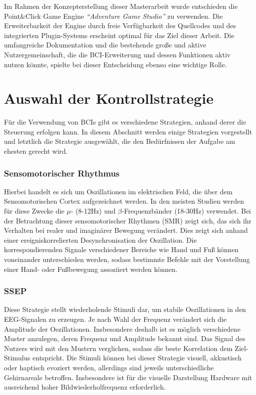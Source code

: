 Im Rahmen der Konzepterstellung dieser Masterarbeit wurde entschieden die Point\&Click Game Engine \textit{"`Adventure Game Studio"'} zu verwenden.
Die Erweiterbarkeit der Engine durch freie Verfügbarkeit des Quellcodes und des integrierten Plugin-Systems erscheint optimal für das Ziel dieser Arbeit.
Die umfangreiche Dokumentation und die bestehende große und aktive Nutzergemeinschaft, 
die die BCI-Erweiterung und dessen Funktionen aktiv nutzen könnte, 
spielte bei dieser Entscheidung ebenso eine wichtige Rolle.\\



\pagebreak
\section{Auswahl der Kontrollstrategie}
Für die Verwendung von BCIs gibt es verschiedene Strategien, anhand derer die Steuerung erfolgen kann.
In diesem Abschnitt werden einige Strategien vorgestellt und letztlich die Strategie ausgewählt, die den Bedürfnissen der Aufgabe am ehesten gerecht wird.\\



\subsubsection{Sensomotorischer Rhythmus}
Hierbei handelt es sich um Oszillationen im elektrischen Feld, die über dem Sensomotorischen Cortex aufgezeichnet werden.
In den meisten Studien werden für diese Zwecke die $\mu$- (8-12Hz) und $\beta$-Frequenzbänder (18-30Hz) verwendet.
Bei der Betrachtung dieser sensomotorischer Rhythmen \cite[S.227ff]{wolpaw2012braincomputer} (\acs{SMR}) zeigt sich, das sich ihr Verhalten bei realer und imaginärer Bewegung verändert.
Dies zeigt sich anhand einer ereignis\-korrelierten Desynchronisation der Oszillation. 
Die korrespondierenden Signale verschiedener Bereiche wie Hand und Fuß können voneinander unterschieden werden, 
sodass bestimmte Befehle mit der Vorstellung einer Hand- oder Fußbewegung assoziiert werden können.\\



\subsubsection{\ac{SSEP}}
Diese Strategie \cite[S.241ff]{wolpaw2012braincomputer} stellt wiederholende Stimuli dar, um stabile Oszillationen in den EEG-Signalen zu erzeugen.
Je nach Wahl der Frequenz verändert sich die Amplitude der Oszillationen.
Insbesondere deshalb ist es möglich verschiedene Muster anzulegen, deren Frequenz und Amplitude bekannt sind.
Das Signal des Nutzers wird mit den Mustern verglichen, sodass die beste Korrelation dem Ziel-Stimulus entspricht.
Die Stimuli können bei dieser Strategie visuell, akkustisch oder haptisch evoziert werden, allerdings sind jeweils unterschiedliche Gehirnareale betroffen.
Insbesondere ist für die visuelle Darstellung Hardware mit ausreichend hoher Bildwiederholfrequenz erforderlich.\\


